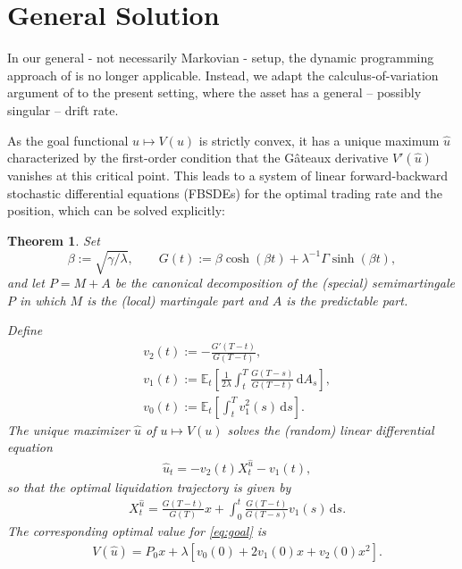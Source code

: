 \documentclass[11pt]{article}
\newtheorem{thm}{Theorem}[section]
\theoremstyle{definition}
\theoremstyle{remark}
\newcommand{\E}{\mathbb{E}} %
\newcommand{\ts}{\textstyle}
\newcommand{\closeEqn}{\tag*{$\diamond$}}
\newcommand{\de}{\,\mathrm{d}}
\begin{document}
\section{General Solution}\label{s:result}

In our general - not necessarily Markovian - setup, the dynamic programming approach of \cite{lehalle2017incorporating} is no longer applicable. Instead, we adapt the calculus-of-variation argument of \cite{bank2017hedging,bouchard2017equilibrium} to the present setting, where the asset has a general -- possibly singular -- drift rate. 

As the goal functional $u\mapsto V(u)$ is strictly convex, it has a unique maximum $\hat{u}$ characterized by the first-order condition that the G\^ateaux derivative $V'(\hat{u})$ vanishes at this critical point. This leads to a system of linear forward-backward stochastic differential equations (FBSDEs) for the optimal trading rate and the position, which can be solved explicitly:

\begin{thm}\label{main}
Set 
$$\beta:=\sqrt{\gamma/\lambda}, \qquad G(t):= \beta\cosh(\beta t)+\lambda^{-1}\Gamma\sinh(\beta t),
$$
and let $P=M+A$ be the canonical decomposition of the (special) semimartingale $P$ in which $M$ is the (local) martingale part and $A$ is the predictable part.

Define 
\begin{align*}
& v_2(t):= %
-\frac{G'(T-t)}{G(T-t)},\\%
& v_1(t):= \E_t\left[ \frac{1}{2\lambda}\int_t^T \frac{G(T-s)}{G(T-t)} \de A_s \right],\\ %
& v_0(t):= \E_t\left[ \int_t^T v_1^2(s) \de s \right].
\end{align*}
The unique maximizer $\hat{u}$ of $u\mapsto V(u)$ solves the (random) linear differential equation
\begin{align}\label{eq:ODE}
&\hat{u}_t = -v_2(t) X^{\hat{u}}_t - v_1(t),
\end{align}
so that the optimal liquidation trajectory is given by
\begin{align}\label{eq:Pos}
&X^{\hat{u}}_t = \frac{G(T-t)}{G(T)}x + \int_0^t \frac{G(T-t)}{G(T-s)} v_1(s) \de s.
\end{align}
The corresponding optimal value for \eqref{eq:goal} is 
\begin{align}\label{eq:goal}
&\ts V(\hat{u}) = P_0 x + \lambda\left[v_0(0) + 2 v_1(0) x + v_2(0) x^2\right]. \closeEqn
\end{align}
\end{thm}
\end{document}
